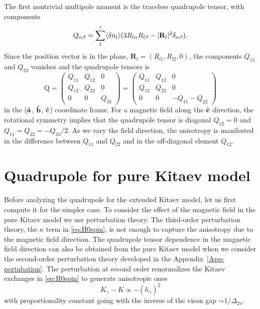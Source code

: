 The first nontrivial multipole moment is the traceless quadrupole tensor, with components
 \begin{equation}
Q_{\alpha\beta}=\sum_{l}^\prime \langle \delta n_l\rangle (3R_{l\alpha}R_{l\beta}-|\mathbf R_l|^2\delta_{\alpha\beta}).
\end{equation}
Since the position vector is in the plane, $\mathbf{R}_l=(R_{l1},R_{l2},0)$, the components $Q_{13}$ and $Q_{23}$ vanishes and the quadrupole tensors is
\begin{equation}
    \mathrm{Q} =
     \left(\begin{array}{ccc}
         Q_{11} & Q_{12} & 0  \\
         Q_{12} & Q_{22} & 0  \\
         0 & 0  & Q_{33}
    \end{array}\right)
    = \left(\begin{array}{ccc}
         Q_{11} & Q_{12} & 0  \\
         Q_{12} & Q_{22} & 0  \\
         0 & 0 & - Q_{11} - Q_{22}
    \end{array}\right)
\end{equation}
in the ($\hat{\mathbf a}$, $\hat{\mathbf b}$, $\hat{\mathbf c}$) coordinate frame.
For a magnetic field along the $\hat{\mathbf c}$ direction, the rotational symmetry implies that the quadrupole tensor is diagonal $Q_{12}=0$ and  $Q_{11}=Q_{22}=-Q_{33}/2$. As we vary the field direction, the anisotropy is manifested in the difference between $Q_{11}$ and $Q_{22}$ and in the off-diagonal element  $Q_{12}$.

\section{Quadrupole for pure Kitaev model }

Before analyzing the quadrupole for the extended Kitaev model, let us first compute it for the simpler case.
To consider the effect of the magnetic field in the pure Kitaev model we use perturbation theory.
The third-order perturbation theory, the $\kappa$ term in \eqref{eq:H0spin}, is not enough to capture the anisotropy due to the magnetic field direction.
The quadrupole tensor dependence in the magnetic field direction can also be obtained from the pure Kitaev model when we consider the second-order perturbation theory developed in the Appendix~\ref{App-pertubation}.
The perturbation at second order renormalizes the Kitaev exchanges in \eqref{eq:H0spin} to generate anisotropic ones $$K_\gamma-K \propto -(h_\gamma)^2$$
with proportionality constant going with the inverse of the vison gap $ \sim 1/\Delta_{2\mathrm v}$.


